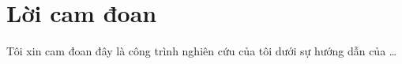 \chapter*{Lời cam đoan}
\label{thanks}
Tôi xin cam đoan đây là công trình nghiên cứu của tôi dưới sự hướng dẫn của \ldots